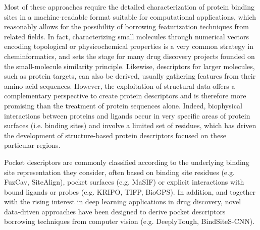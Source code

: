Most of these approaches require the detailed characterization of protein binding sites in a machine-readable format suitable for computational applications, which reasonably allows for the possibility of borrowing featurization techniques from related fields. In fact, characterizing small molecules through numerical vectors encoding topological or physicochemical properties is a very common strategy in cheminformatics, and sets the stage for many drug discovery projects founded on the small-molecule similarity principle\cite{fernandez-torras_connecting_2022, cereto-massague_molecular_2015, muegge_overview_2016}. Likewise, descriptors for larger molecules, such as protein targets, can also be derived, usually gathering features from their amino acid sequences\cite{bileschi_using_2022}. However, the exploitation of structural data offers a complementary perspective to create protein descriptors and is therefore more promising than the treatment of protein sequences alone. Indeed, biophysical interactions between proteins and ligands occur in very specific areas of protein surfaces (i.e. binding sites) and involve a limited set of residues, which has driven the development of structure-based protein descriptors focused on these particular regions\cite{eguida_estimating_2022}.

Pocket descriptors are commonly classified according to the underlying binding site representation they consider, often based on binding site residues (e.g. FuzCav\cite{weill_alignment-free_2010}, SiteAlign\cite{schalon_simple_2008}), pocket surfaces (e.g. MaSIF\cite{gainza_deciphering_2020}) or explicit interactions with bound ligands or probes (e.g. KRIPO\cite{wood_pharmacophore_2012}, TIFP\cite{desaphy_encoding_2013}, BioGPS\cite{siragusa_biogps_2015}). In addition, and together with the rising interest in deep learning applications in drug discovery\cite{chen_rise_2018}, novel data-driven approaches have been designed to derive pocket descriptors borrowing techniques from computer vision (e.g. DeeplyTough\cite{simonovsky_deeplytough_2020}, BindSiteS-CNN\cite{scott_classification_2022}). 

